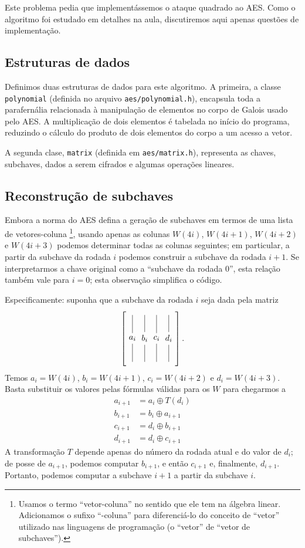 \documentclass{article}
\newcommand{\xor}{\oplus}
\newcommand{\colvec}[1]{
    \tikz[baseline=-3pt]{
        \node (center) at (0, 0) {$#1$};
        \draw (center) -- (0, 1) (0, 1.2);
        \draw (center) -- (0, -1) (0, -1.2);
    }
}
\begin{document}
Este problema pedia que implementássemos o ataque quadrado ao AES.
Como o algoritmo foi estudado em detalhes na aula,
discutiremos aqui apenas questões de implementação.

\subsection{Estruturas de dados}

Definimos duas estruturas de dados para este algoritmo.
A primeira,
a classe \verb"polynomial"
(definida no arquivo \verb"aes/polynomial.h"),
encapsula toda a parafernália relacionada
à manipulação de elementos no corpo de Galois usado pelo AES.
A multiplicação de dois elementos é tabelada no início do programa,
reduzindo o cálculo do produto de dois elementos do corpo
a um acesso a vetor.

A segunda clase,
\verb"matrix" (definida em \verb"aes/matrix.h"),
representa as chaves, subchaves, dados a serem cifrados
e algumas operações lineares.

\subsection{Reconstrução de subchaves}

Embora a norma do AES defina a geração de subchaves em termos de
uma lista de vetores-coluna%
\footnote{
    Usamos o termo ``vetor-coluna'' no sentido que ele tem na álgebra linear.
    Adicionamos o sufixo ``-coluna'' para diferenciá-lo
    do conceito de ``vetor'' utilizado nas linguagens de programação
    (o ``vetor'' de ``vetor de subchaves'').
},
usando apenas as colunas $W(4i)$, $W(4i+1)$, $W(4i+2)$ e $W(4i+3)$
podemos determinar todas as colunas seguintes;
em particular,
a partir da subchave da rodada $i$
podemos construir a subchave da rodada $i+1$.
Se interpretarmos a chave original como a ``subchave da rodada $0$'',
esta relação também vale para $i = 0$;
esta observação simplifica o código.

Especificamente: suponha que a subchave da rodada $i$
seja dada pela matriz
\begin{equation*}
    \left[ \colvec{a_i} \colvec{b_i} \colvec{c_i} \colvec{d_i} \right].
\end{equation*}
Temos $a_i = W(4i)$, $b_i = W(4i+1)$, $c_i = W(4i+2)$ e $d_i = W(4i+3)$.
Basta substituir os valores pelas fórmulas válidas para os $W$
para chegarmos a
\begin{align*}
    a_{i+1} &= a_i \xor T(d_i) \\
    b_{i+1} &= b_i \xor a_{i+1} \\
    c_{i+1} &= d_i \xor b_{i+1} \\
    d_{i+1} &= d_i \xor c_{i+1}
\end{align*}
A transformação $T$ depende apenas do número da rodada atual e do valor de $d_i$;
de posse de $a_{i+1}$, podemos computar $b_{i+1}$,
e então $c_{i+1}$
e, finalmente, $d_{i+1}$.
Portanto, podemos computar a subchave $i+1$ a partir da subchave $i$.
\end{document}
